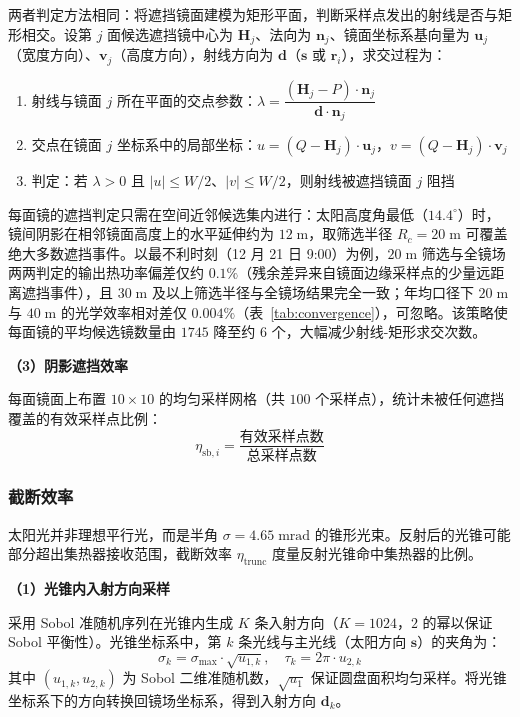 \documentclass[12pt,a4paper,fontset=fandol]{ctexart}
\begin{document}
两者判定方法相同：将遮挡镜面建模为矩形平面，判断采样点发出的射线是否与矩形相交。设第 $j$ 面候选遮挡镜中心为 $\mathbf{H}_j$、法向为 $\mathbf{n}_j$、镜面坐标系基向量为 $\mathbf{u}_j$（宽度方向）、$\mathbf{v}_j$（高度方向），射线方向为 $\mathbf{d}$（$\mathbf{s}$ 或 $\mathbf{r}_i$），求交过程为：
\begin{enumerate}
    \item 射线与镜面 $j$ 所在平面的交点参数：$\lambda = \dfrac{(\mathbf{H}_j - P) \cdot \mathbf{n}_j}{\mathbf{d} \cdot \mathbf{n}_j}$
    \item 交点在镜面 $j$ 坐标系中的局部坐标：$u = (Q - \mathbf{H}_j) \cdot \mathbf{u}_j$，$v = (Q - \mathbf{H}_j) \cdot \mathbf{v}_j$
    \item 判定：若 $\lambda > 0$ 且 $|u| \leq W/2$、$|v| \leq W/2$，则射线被遮挡镜面 $j$ 阻挡
\end{enumerate}
每面镜的遮挡判定只需在空间近邻候选集内进行：太阳高度角最低（$14.4^{\circ}$）时，镜间阴影在相邻镜面高度上的水平延伸约为 $12\;\mathrm{m}$，取筛选半径 $R_c = 20\;\mathrm{m}$ 可覆盖绝大多数遮挡事件。以最不利时刻（12 月 21 日 9:00）为例，$20\;\mathrm{m}$ 筛选与全镜场两两判定的输出热功率偏差仅约 $0.1\%$（残余差异来自镜面边缘采样点的少量远距离遮挡事件），且 $30\;\mathrm{m}$ 及以上筛选半径与全镜场结果完全一致；年均口径下 $20\;\mathrm{m}$ 与 $40\;\mathrm{m}$ 的光学效率相对差仅 $0.004\%$（表~\ref{tab:convergence}），可忽略。该策略使每面镜的平均候选镜数量由 $1745$ 降至约 $6$ 个，大幅减少射线-矩形求交次数。

\textbf{（3）阴影遮挡效率}

每面镜面上布置 $10 \times 10$ 的均匀采样网格（共 $100$ 个采样点），统计未被任何遮挡覆盖的有效采样点比例：
\begin{equation}
    \eta_{\mathrm{sb},i} = \frac{\text{有效采样点数}}{\text{总采样点数}}
    \label{eq:eta_sb}
\end{equation}

\subsubsection{截断效率}

太阳光并非理想平行光，而是半角 $\sigma = 4.65\;\mathrm{mrad}$ 的锥形光束\cite{2}。反射后的光锥可能部分超出集热器接收范围，截断效率 $\eta_{\mathrm{trunc}}$ 度量反射光锥命中集热器的比例。

\textbf{（1）光锥内入射方向采样}

采用 Sobol 准随机序列在光锥内生成 $K$ 条入射方向（$K = 1024$，$2$ 的幂以保证 Sobol 平衡性）。光锥坐标系中，第 $k$ 条光线与主光线（太阳方向 $\mathbf{s}$）的夹角为：
\begin{equation}
    \sigma_k = \sigma_{\max} \cdot \sqrt{u_{1,k}}, \quad \tau_k = 2\pi \cdot u_{2,k}
    \label{eq:cone_sample}
\end{equation}
其中 $(u_{1,k}, u_{2,k})$ 为 Sobol 二维准随机数，$\sqrt{u_1}$ 保证圆盘面积均匀采样。将光锥坐标系下的方向转换回镜场坐标系，得到入射方向 $\mathbf{d}_k$。
\end{document}
